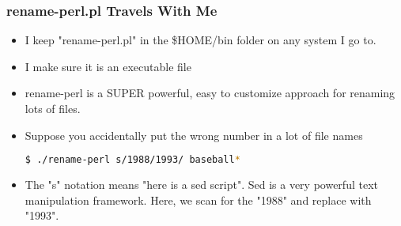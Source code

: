 \documentclass[English]{beamer}
\begin{document}

\begin{frame}
  \frametitle{rename-perl.pl Travels With Me}

  \begin{itemize}
  \item I keep "rename-perl.pl" in
    the \$HOME/bin folder on any system I go to.
  \item I make sure it is an executable file 

  \item rename-perl is a SUPER powerful, easy to customize approach
    for renaming lots of files.
    
  \item Suppose you accidentally put the wrong number in a lot of file names
    
\begin{lstlisting}[basicstyle={\scriptsize},breaklines=true,language=bash] 
$ ./rename-perl s/1988/1993/ baseball*      
\end{lstlisting} 
  \item The "s" notation means "here is a sed script".  Sed is a very powerful
    text manipulation framework. Here, we scan for the "1988" and
    replace with "1993".

  \end{itemize}
\end{frame}
\end{document}
